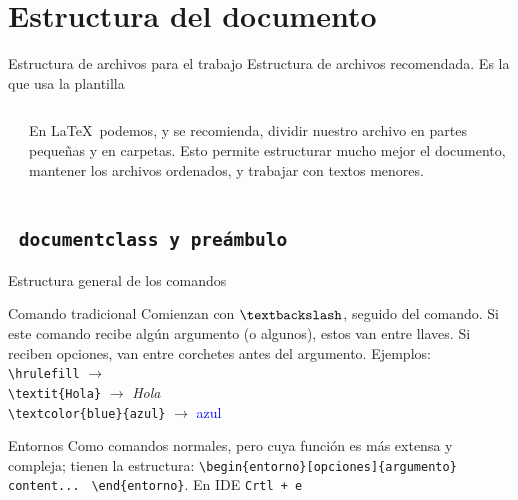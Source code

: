 \documentclass[12pt]{beamer}
\begin{document}
\section{Estructura del documento}

\begin{frame}{Estructura de archivos para el trabajo}
	Estructura de archivos recomendada. Es la que usa la plantilla
	\begin{columns}
		\begin{column}{0.4\textwidth}
		\end{column}
		\begin{column}{0.6\textwidth}
			En \LaTeX\ podemos, y se recomienda, dividir nuestro archivo en partes pequeñas y en carpetas. Esto permite estructurar mucho mejor el documento, mantener los archivos ordenados, y trabajar con textos menores.
		\end{column}
	\end{columns}
\end{frame}

\subsection{\texttt{\ documentclass y preámbulo}}

\begin{frame}[fragile]{Estructura general de los comandos}
	\begin{block}{Comando tradicional}
		Comienzan con $\textbackslash$, seguido del comando. Si este comando recibe algún argumento (o algunos), estos van entre llaves. Si reciben opciones, van entre corchetes antes del argumento. Ejemplos: \\
		\verb|\hrulefill| $\rightarrow$ \hrulefill \\
		\verb|\textit{Hola}| $\rightarrow$ \textit{Hola} \\
		\verb|\textcolor{blue}{azul}| $\rightarrow$ \textcolor{blue}{azul}
	\end{block} \pause
	\begin{block}{Entornos}
		Como comandos normales, pero cuya función es más extensa y compleja; tienen la estructura: \verb|\begin{entorno}[opciones]{argumento}| \verb| content... | 
	\verb|\end{entorno}|. En IDE \texttt{Crtl + e}
	\end{block}
\end{frame}
\end{document}
